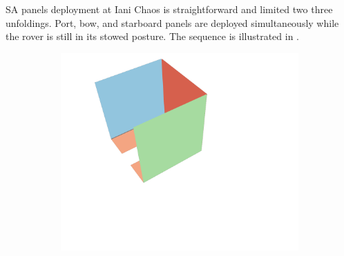\ac{SA} panels deployment at Iani Chaos is straightforward and limited two three unfoldings. Port, bow, and starboard panels are deployed simultaneously while the rover is still in its stowed posture. The sequence is illustrated in .

\vspace{0.5cm}

\begin{figure}[h]
\captionsetup[subfigure]{justification=centering}
\vspace{-2ex}
	\centering
    \setlength{\subfigureWidth}{0.32\textwidth}
    \setlength{\graphicsHeight}{30mm}
    \hypersetup{hidelinks=true}%
	\begin{subfigure}[t]{\subfigureWidth}
        \centering
		\includegraphics[height=\graphicsHeight]{sections/design/solar-array/images/deployment/iani-chaos/solar_array_deployment_iani_chaos_000.png}
		\label{fig:sub:deployment-sequence-iani-chaos-stowed}
	\end{subfigure}\hfill
	\begin{subfigure}[t]{\subfigureWidth}
        \centering

\end{subfigure}
\end{figure}
